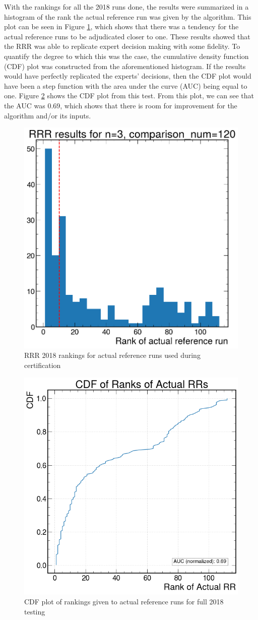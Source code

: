 With the rankings for all the 2018 runs done, the results were summarized in a histogram of the rank the actual reference run was given by the algorithm. This plot can be seen in Figure \ref{fig:rrr_hist}, which shows that there was a tendency for the actual reference runs to be adjudicated closer to one. These results showed that the RRR was able to replicate expert decision making with some fidelity. To quantify the degree to which this was the case, the cumulative density function (CDF) plot was constructed from the aforementioned histogram. If the results would have perfectly replicated the experts' decisions, then the CDF plot would have been a step function with the area under the curve (AUC) being equal to one. Figure \ref{fig:rrr_cdf} shows the CDF plot from this test. From this plot, we can see that the AUC was 0.69, which shows that there is room for improvement for the algorithm and/or its inputs.

\begin{figure}[h]
    \centering
    \includegraphics[width=0.5\linewidth]{images/RRR/rrr_testing.png}
    \caption{RRR 2018 rankings for actual reference runs used during certification}
    \label{fig:rrr_hist}
\end{figure}

\begin{figure}[h]
    \centering
    \includegraphics[width=0.5\linewidth]{images/RRR/rrr_test_cdf.png}
    \caption{CDF plot of rankings given to actual reference runs for full 2018 testing}
    \label{fig:rrr_cdf}
\end{figure}

